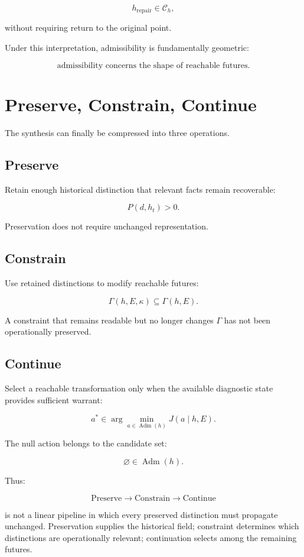 \documentclass[11pt]{article}
\newcommand{\Adm}{\operatorname{Adm}}
\begin{document}
\[ h_{\mathrm{repair}}\in\mathcal C_h,\]

without requiring return to the original point.

Under this interpretation, admissibility is fundamentally geometric:

\[ \boxed{ \text{admissibility concerns the shape of reachable futures}. }\]

\section{Preserve, Constrain, Continue}

The synthesis can finally be compressed into three operations.

\subsection*{Preserve}

Retain enough historical distinction that relevant facts remain recoverable:

\[ P(d,h_t)>0.\]

Preservation does not require unchanged representation.

\subsection*{Constrain}

Use retained distinctions to modify reachable futures:

\[ \Gamma(h,E,\kappa) \subseteq \Gamma(h,E).\]

A constraint that remains readable but no longer changes $\Gamma$ has not been operationally preserved.

\subsection*{Continue}

Select a reachable transformation only when the available diagnostic state provides sufficient warrant:

\[ a^* \in \arg\min_{a\in\Adm(h)} J(a\mid h,E).\]

The null action belongs to the candidate set:

\[ \varnothing\in\Adm(h).\]

Thus:

\[ \boxed{ \text{Preserve} \rightarrow \text{Constrain} \rightarrow \text{Continue} }\]

is not a linear pipeline in which every preserved distinction must propagate unchanged. Preservation supplies the historical field; constraint determines which distinctions are operationally relevant; continuation selects among the remaining futures.
\end{document}
